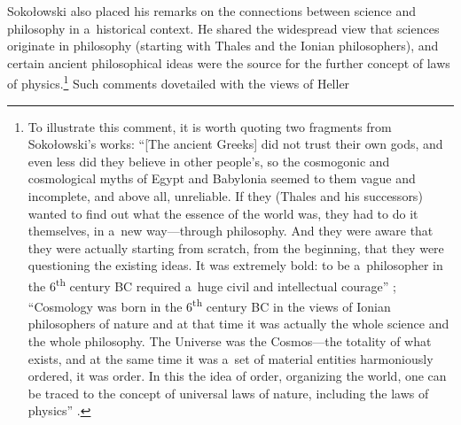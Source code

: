 \documentclass[%
  manuscript=article,
  year=2024,
  volume=77,
  doi=10.59203/zfn.77.689,
]{zfn}
\begin{document}
Sokołowski also placed his remarks on the connections between science and philosophy in a~historical context. He shared the widespread view that sciences originate in philosophy (starting with Thales and the Ionian philosophers), and certain ancient philosophical ideas were the source for the further concept of laws of physics.\footnote{To illustrate this comment, it is worth quoting two fragments from Sokołowski's works:
``[The ancient Greeks] did not trust their own gods, and even less did they believe in other people's, so the cosmogonic and cosmological myths of Egypt and Babylonia seemed to them vague and incomplete, and above all, unreliable. If they (Thales and his successors) wanted to find out what the essence of the world was, they had to do it themselves, in a~new way---through philosophy. And they were aware that they were actually starting from scratch, from the beginning, that they were questioning the existing ideas. It was extremely bold: to be a~philosopher in the 6\textsuperscript{th} century BC required a~huge civil and intellectual courage''
\parencite[][p.44]{Sokoowski1989Gos}; %
``Cosmology was born in the 6\textsuperscript{th} century BC in the views of Ionian philosophers of nature and at that time it was actually the whole science and the whole philosophy. The Universe was the Cosmos---the totality of what exists, and at the same time it was a~set of material entities harmoniously ordered, it was order. In this the idea of order, organizing the world, one can be traced to the concept of universal laws of nature, including the laws of physics''
\parencite[][p.28]{Sokoowski2015Granice}.%
} Such comments dovetailed with the views of Heller 
\end{document}
